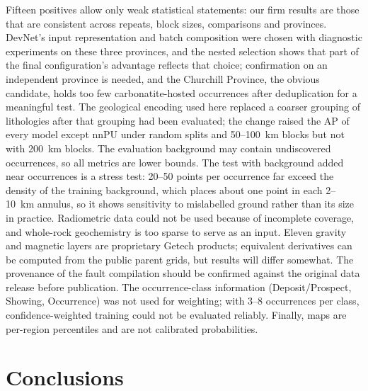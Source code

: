 \documentclass[pdflatex,sn-apa]{sn-jnl}
\begin{document}
Fifteen positives allow only weak statistical statements: our firm results are those that are consistent across repeats, block sizes, comparisons and provinces. DevNet's input representation and batch composition were chosen with diagnostic experiments on these three provinces, and the nested selection shows that part of the final configuration's advantage reflects that choice; confirmation on an independent province is needed, and the Churchill Province, the obvious candidate, holds too few carbonatite-hosted occurrences after deduplication for a meaningful test. The geological encoding used here replaced a coarser grouping of lithologies after that grouping had been evaluated; the change raised the AP of every model except nnPU under random splits and 50--100~km blocks but not with 200~km blocks. The evaluation background may contain undiscovered occurrences, so all metrics are lower bounds. The test with background added near occurrences is a stress test: 20--50 points per occurrence far exceed the density of the training background, which places about one point in each 2--10~km annulus, so it shows sensitivity to mislabelled ground rather than its size in practice. Radiometric data could not be used because of incomplete coverage, and whole-rock geochemistry is too sparse to serve as an input. Eleven gravity and magnetic layers are proprietary Getech products; equivalent derivatives can be computed from the public parent grids, but results will differ somewhat. The provenance of the fault compilation should be confirmed against the original data release before publication. The occurrence-class information (Deposit/Prospect, Showing, Occurrence) was not used for weighting; with 3--8 occurrences per class, confidence-weighted training could not be evaluated reliably. Finally, maps are per-region percentiles and are not calibrated probabilities.

\section{Conclusions}\label{sec:conclusions}
\end{document}
